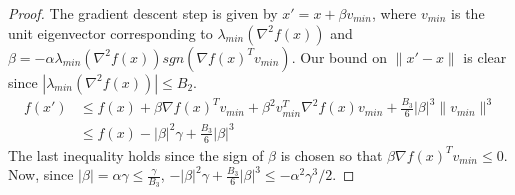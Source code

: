 \begin{proof}
The gradient descent step is given by $x' = x + \beta v_{min}$, where $v_{min}$ is the unit eigenvector corresponding to $\lambda_{min}(\nabla^2f(x))$ and $\beta = -\alpha\lambda_{min}(\nabla^2 f(x))sgn(\nabla f(x)^Tv_{min})$. Our bound on $\|x' - x\|$ is clear since $|\lambda_{min}(\nabla^2 f(x))| \leq B_2$.
\begin{align*}
f(x') &\leq f(x) + \beta\nabla f(x)^Tv_{min} + \beta^2 v_{min}^T\nabla^2f(x)v_{min} + \frac{B_3}{6} |\beta|^3 \|v_{min}\|^3 \\
&\leq f(x) - |\beta|^2 \gamma + \frac{B_3}{6} |\beta|^3
\end{align*}
The last inequality holds since the sign of $\beta$ is chosen so that $\beta \nabla f(x)^Tv_{min} \leq 0$. Now, since $|\beta| = \alpha \gamma \leq \frac{\gamma}{B_3}$, $-|\beta|^2\gamma + \frac{B_3}{6} |\beta|^3 \leq - \alpha^2 \gamma^3/2$. 
\end{proof}

